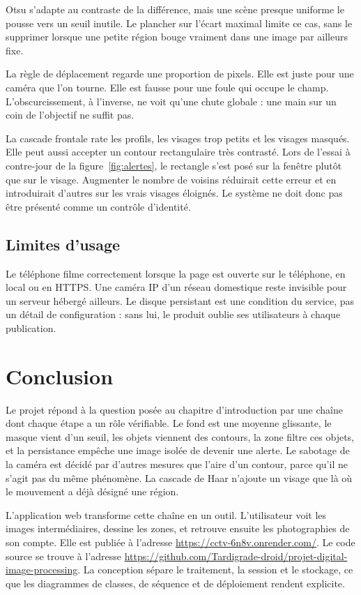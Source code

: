 Otsu s'adapte au contraste de la différence, mais une scène presque uniforme le pousse vers un seuil inutile. Le plancher sur l'écart maximal limite ce cas, sans le supprimer lorsque une petite région bouge vraiment dans une image par ailleurs fixe.

La règle de déplacement regarde une proportion de pixels. Elle est juste pour une caméra que l'on tourne. Elle est fausse pour une foule qui occupe le champ. L'obscurcissement, à l'inverse, ne voit qu'une chute globale : une main sur un coin de l'objectif ne suffit pas.

La cascade frontale rate les profils, les visages trop petits et les visages masqués. Elle peut aussi accepter un contour rectangulaire très contrasté. Lors de l'essai à contre-jour de la figure~\ref{fig:alertes}, le rectangle s'est posé sur la fenêtre plutôt que sur le visage. Augmenter le nombre de voisins réduirait cette erreur et en introduirait d'autres sur les vrais visages éloignés. Le système ne doit donc pas être présenté comme un contrôle d'identité.

\section{Limites d'usage}

Le téléphone filme correctement lorsque la page est ouverte sur le téléphone, en local ou en HTTPS. Une caméra IP d'un réseau domestique reste invisible pour un serveur hébergé ailleurs. Le disque persistant est une condition du service, pas un détail de configuration : sans lui, le produit oublie ses utilisateurs à chaque publication.

\chapter{Conclusion}

Le projet répond à la question posée au chapitre d'introduction par une chaîne dont chaque étape a un rôle vérifiable. Le fond est une moyenne glissante, le masque vient d'un seuil, les objets viennent des contours, la zone filtre ces objets, et la persistance empêche une image isolée de devenir une alerte. Le sabotage de la caméra est décidé par d'autres mesures que l'aire d'un contour, parce qu'il ne s'agit pas du même phénomène. La cascade de Haar n'ajoute un visage que là où le mouvement a déjà désigné une région.

L'application web transforme cette chaîne en un outil. L'utilisateur voit les images intermédiaires, dessine les zones, et retrouve ensuite les photographies de son compte. Elle est publiée à l'adresse \url{https://cctv-6n8v.onrender.com/}. Le code source se trouve à l'adresse \url{https://github.com/Tardigrade-droid/projet-digital-image-processing}. La conception sépare le traitement, la session et le stockage, ce que les diagrammes de classes, de séquence et de déploiement rendent explicite.

